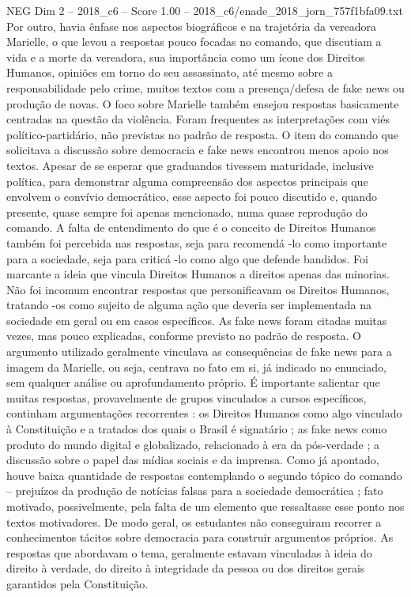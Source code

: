 \begin{textsample}{NEG Dim 2 – 2018\_c6 – Score 1.00 – 2018\_c6/enade\_2018\_jorn\_757f1bfa09.txt}
Por outro, havia ênfase nos aspectos biográficos e na trajetória da vereadora Marielle, o que levou a respostas pouco focadas no comando, que discutiam a vida e a morte da vereadora, sua importância como um ícone dos Direitos Humanos, opiniões em torno do seu assassinato, até mesmo sobre a responsabilidade pelo crime, muitos textos com a presença/defesa de fake news ou produção de novas.
O foco sobre Marielle também ensejou respostas basicamente centradas na questão da violência.
Foram frequentes as interpretações com viés político-partidário, não previstas no padrão de resposta.
O item do comando que solicitava a discussão sobre democracia e fake news encontrou menos apoio nos textos.
Apesar de se esperar que graduandos tivessem maturidade, inclusive política, para demonstrar alguma compreensão dos aspectos principais que envolvem o convívio democrático, esse aspecto foi pouco discutido e, quando presente, quase sempre foi apenas mencionado, numa quase reprodução do comando.
A falta de entendimento do que é o conceito de Direitos Humanos também foi percebida nas respostas, seja para recomendá -lo como importante para a sociedade, seja para criticá -lo como algo que defende bandidos.
Foi marcante a ideia que vincula Direitos Humanos a direitos apenas das minorias.
Não foi incomum encontrar respostas que personificavam os Direitos Humanos, tratando -os como sujeito de alguma ação que deveria ser implementada na sociedade em geral ou em casos específicos.
As fake news foram citadas muitas vezes, mas pouco explicadas, conforme previsto no padrão de resposta.
O argumento utilizado geralmente vinculava as consequências de fake news para a imagem da Marielle, ou seja, centrava no fato em si, já indicado no enunciado, sem qualquer análise ou aprofundamento próprio.
É importante salientar que muitas respostas, provavelmente de grupos vinculados a cursos específicos, continham argumentações recorrentes : os Direitos Humanos como algo vinculado à Constituição e a tratados dos quais o Brasil é signatário ; as fake news como produto do mundo digital e globalizado, relacionado à era da pós-verdade ; a discussão sobre o papel das mídias sociais e da imprensa.
Como já apontado, houve baixa quantidade de respostas contemplando o segundo tópico do comando – prejuízos da produção de notícias falsas para a sociedade democrática ; fato motivado, possivelmente, pela falta de um elemento que ressaltasse esse ponto nos textos motivadores.
De modo geral, os estudantes não conseguiram recorrer a conhecimentos tácitos sobre democracia para construir argumentos próprios.
As respostas que abordavam o tema, geralmente estavam vinculadas à ideia do direito à verdade, do direito à integridade da pessoa ou dos direitos gerais garantidos pela Constituição.

\end{textsample}
